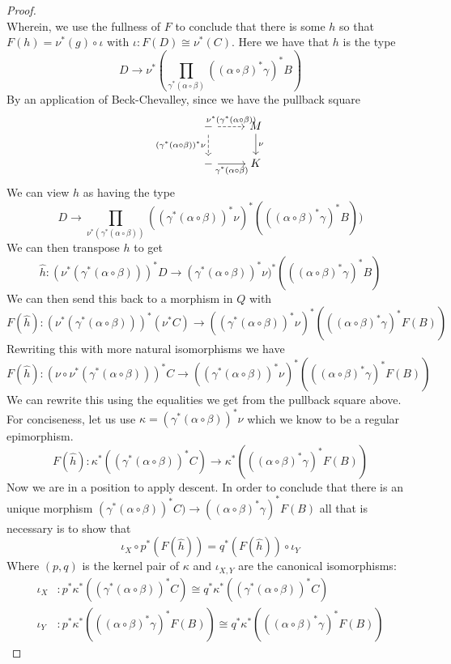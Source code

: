 \begin{proof}
\[  \]
  Wherein, we use the fullness of $F$ to conclude that there is some
  $h$ so that $F(h) = \nu^*(g) \circ \iota$ with
  $\iota : F(D) \cong \nu^*(C)$. Here we have that $h$ is the type
  \[
    D \to \nu^*(\prod_{\gamma^*(\alpha \circ \beta)} ((\alpha \circ \beta)^*\gamma)^* B)
  \]
  By an application of Beck-Chevalley, since we have the pullback
  square
  \[
    \begin{tikzcd}
      - \ar[r, "\nu^*(\gamma^*(\alpha \circ \beta))", dashed]
        \ar[d, swap, "(\gamma^*(\alpha \circ \beta))^*\nu", dashed] &
      M \ar[d, "\nu"]\\
      - \ar[r, swap, "\gamma^*(\alpha \circ \beta)"]  & K
    \end{tikzcd}
  \]
  We can view $h$ as having the type
  \[
    D \to \prod_{\nu^*(\gamma^*(\alpha \circ \beta))} ((\gamma^*(\alpha \circ \beta))^*\nu)^*(((\alpha \circ \beta)^*\gamma)^* B))
  \]
  We can then transpose $h$ to get
  \[
    \hat{h} : (\nu^*(\gamma^*(\alpha \circ \beta)))^*D \to (\gamma^*(\alpha \circ \beta))^*\nu)^*(((\alpha \circ \beta)^*\gamma)^* B)
  \]
  We can then send this back to a morphism in $Q$ with
  \[
    F(\hat{h}) :
    (\nu^*(\gamma^*(\alpha \circ \beta)))^*(\nu^* C) \to ((\gamma^*(\alpha \circ \beta))^*\nu)^*(((\alpha \circ \beta)^*\gamma)^* F(B))
  \]
  Rewriting this with more natural isomorphisms we have
  \[
    F(\hat{h}) :
    (\nu \circ \nu^*(\gamma^*(\alpha \circ \beta)))^*C \to
    ((\gamma^*(\alpha \circ \beta))^*\nu)^*(((\alpha \circ \beta)^*\gamma)^* F(B))
  \]
  We can rewrite this using the equalities we get from the pullback
  square above. For conciseness, let us use
  $\kappa = (\gamma^*(\alpha \circ \beta))^*\nu$ which we know to be a
  regular epimorphism.
  \[
    F(\hat{h}) :
    \kappa^*((\gamma^*(\alpha \circ \beta))^*C) \to
    \kappa^*(((\alpha \circ \beta)^*\gamma)^* F(B))
  \]
  Now we are in a position to apply descent. In order to conclude that
  there is an unique morphism
  $(\gamma^*(\alpha \circ \beta))^*C) \to ((\alpha \circ \beta)^*\gamma)^* F(B)$
  all that is necessary is to show that
  \[
    \iota_X \circ p^*(F(\hat{h})) = q^*(F(\hat{h})) \circ \iota_Y
  \]
  Where $(p, q)$ is the kernel pair of $\kappa$ and $\iota_{X, Y}$ are
  the canonical isomorphisms:
  \begin{align*}
    \iota_X &: p^*\kappa^*((\gamma^*(\alpha \circ \beta))^*C) \cong q^*\kappa^*((\gamma^*(\alpha \circ \beta))^*C)\\
    \iota_Y &: p^*\kappa^*(((\alpha \circ \beta)^*\gamma)^* F(B)) \cong q^*\kappa^*(((\alpha \circ \beta)^*\gamma)^* F(B))
  \end{align*}


\end{proof}
